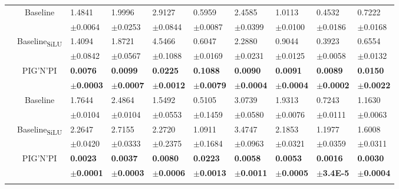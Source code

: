 \documentclass{article}
\newcommand{\pignpi}{PIG'N'PI\xspace}
\begin{document}
\begin{table}[h!]
{\begin{tabularx}{\textwidth}{ccXXXXXXXX}
        &\multirow{2}{*}{Baseline}
        & 1.4841 & 1.9996 & 2.9127 & 0.5959 & 2.4585 & 1.0113 & 0.4532 & 0.7222\\
        &&\scriptsize$\pm$0.0064 & \scriptsize $\pm$0.0253 & \scriptsize $\pm$0.0844 & \scriptsize $\pm$0.0087 & \scriptsize $\pm$0.0399 & \scriptsize $\pm$0.0100 & \scriptsize $\pm$0.0186 & \scriptsize $\pm$0.0168\\
        \cline{3-10}\rule{0pt}{2.3ex}
        &\multirow{2}{*}{{Baseline\textsubscript{SiLU}}}
        & 1.4094 & 1.8721 & 4.5466 & 0.6047 & 2.2880 & 0.9044 & 0.3923 & 0.6554 \\
        &&\scriptsize$\pm$0.0842 & \scriptsize $\pm$0.0567 & \scriptsize $\pm$0.1088 & \scriptsize $\pm$0.0169 & \scriptsize $\pm$0.0231 & \scriptsize $\pm$0.0125 & \scriptsize $\pm$0.0058 & \scriptsize $\pm$0.0132\\
        \cline{3-10}\rule{0pt}{2.3ex}
        &\multirow{2}{*}{\pignpi}
        & \textbf{0.0076} & \textbf{0.0099} & \textbf{0.0225} & \textbf{0.1088} & \textbf{0.0090} & \textbf{0.0091} & \textbf{0.0089} & \textbf{0.0150}\\
        && \scriptsize \textbf{$\pm$0.0003} & \scriptsize \textbf{$\pm$0.0007} & \scriptsize \textbf{$\pm$0.0012} & \scriptsize \textbf{$\pm$0.0079} & \scriptsize \textbf{$\pm$0.0004} & \scriptsize \textbf{$\pm$0.0004} & \scriptsize \textbf{$\pm$0.0002} & \scriptsize \textbf{$\pm$0.0022}\\
        \hline\rule{0pt}{2.3ex}
        
        \multirow{6}{*}{\textsf{MAE\textsubscript{ef}}}
        &\multirow{2}{*}{Baseline}
        & 1.7644 & 2.4864 & 1.5492 & 0.5105 & 3.0739 & 1.9313 & 0.7243 & 1.1630 \\
        &&\scriptsize$\pm$0.0104 & \scriptsize $\pm$0.0104 & \scriptsize $\pm$0.0553 & \scriptsize $\pm$0.1459 & \scriptsize $\pm$0.0580 & \scriptsize $\pm$0.0076 & \scriptsize $\pm$0.0111 & \scriptsize $\pm$0.0063\\
        \cline{3-10}\rule{0pt}{2.3ex}
        &\multirow{2}{*}{{Baseline\textsubscript{SiLU}}}
        & 2.2647 & 2.7155 & 2.2720 & 1.0911 & 3.4747 & 2.1853 & 1.1977 & 1.6008 \\
        &&\scriptsize$\pm$0.0420 & \scriptsize $\pm$0.0333 & \scriptsize $\pm$0.2375 & \scriptsize $\pm$0.1684 & \scriptsize $\pm$0.0963 & \scriptsize $\pm$0.0321 & \scriptsize $\pm$0.0359 & \scriptsize $\pm$0.0311\\
        \cline{3-10}\rule{0pt}{2.3ex}
        &\multirow{2}{*}{\pignpi}
        & \textbf{0.0023} & \textbf{0.0037} & \textbf{0.0080} & \textbf{0.0223} & \textbf{0.0058} & \textbf{0.0053} & \textbf{0.0016} & \textbf{0.0030} \\
        && \scriptsize \textbf{$\pm$0.0001} & \scriptsize \textbf{$\pm$0.0003} & \scriptsize \textbf{$\pm$0.0006} & \scriptsize \textbf{$\pm$0.0013} & \scriptsize \textbf{$\pm$0.0011} & \scriptsize \textbf{$\pm$0.0005} & \tiny\textbf{$\pm$3.4E-5} & \scriptsize \textbf{$\pm$0.0004}\\
        \hline\rule{0pt}{2.3ex}
        

\end{tabularx}}
\end{table}
\end{document}
